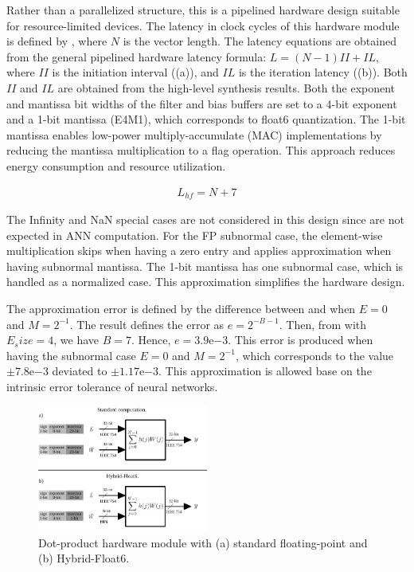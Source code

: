 Rather than a parallelized structure, this is a pipelined hardware design suitable for resource-limited devices. The latency in clock cycles of this hardware module is defined by , where $N$ is the vector length. The latency equations are obtained from the general pipelined hardware latency formula: $L=\left(N-1\right)II+IL$, where $II$ is the initiation interval ((a)), and $IL$ is the iteration latency ((b)). Both $II$ and $IL$ are obtained from the high-level synthesis results. Both the exponent and mantissa bit widths of the filter and bias buffers are set to a 4-bit exponent and a 1-bit mantissa (E4M1), which corresponds to float6 quantization. The 1-bit mantissa enables low-power multiply-accumulate (MAC) implementations by reducing the mantissa multiplication to a flag operation. This approach reduces energy consumption and resource utilization.

\begin{eqnarray} \label{eq:dot_custom_float_latency}
L_{hf}=N+7
\end{eqnarray}

The Infinity and NaN special cases are not considered in this design since are not expected in ANN computation. For the FP subnormal case, the element-wise multiplication skips when having a zero entry and applies approximation when having subnormal mantissa. The 1-bit mantissa has one subnormal case, which is handled as a normalized case. This approximation simplifies the hardware design.

The approximation error is defined by the difference between  and  when $E=0$ and $M=2^{-1}$. The result defines the error as $e=2^{-B-1}$. Then, from  with $E_size=4$, we have $B=7$. Hence, $e=3.9\mathrm{e}{-3}$. This error is produced when having the subnormal case $E=0$ and $M=2^{-1}$, which corresponds to the value $\pm7.8\mathrm{e}{-3}$ deviated to $\pm1.17\mathrm{e}{-3}$. This approximation is allowed base on the intrinsic error tolerance of neural networks\cite{du2014leveraging}.

\begin{figure}[t!]
	\centering
	\includegraphics[width=0.5\textwidth]{../figures/dot-product_unit.pdf}
	\caption{Dot-product hardware module with (a) standard floating-point and (b) Hybrid-Float6.}
	\label{fig:dot_product}
\end{figure}


